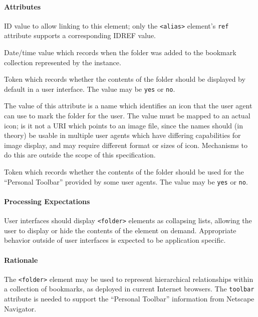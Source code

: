 \documentclass{howto}
\newcommand{\element}[1]{\texttt{<#1>}}
\newcommand{\attribute}[1]{\texttt{#1}}
\newcommand{\nmtoken}[1]{\texttt{#1}}
\begin{document}
      \paragraph*{Attributes}
        \begin{definitions}
          \term{\attribute{id}}
          ID value to allow linking to this element; only the
          \element{alias} element's \attribute{ref} attribute supports
          a corresponding IDREF value.

          \term{\attribute{added}}
          Date/time value which records when the folder was added to
          the bookmark collection represented by the instance.

          \term{\attribute{folded}}
          Token which records whether the contents of the folder
          should be displayed by default in a user interface.  The
          value may be \nmtoken{yes} or \nmtoken{no}.

          \term{\attribute{icon}}
          The value of this attribute is a name which identifies an
          icon that the user agent can use to mark the folder for the
          user.  The value must be mapped to an actual icon; is it not
          a URI which points to an image file, since the names should
          (in theory) be usable in multiple user agents which have
          differing capabilities for image display, and may require
          different format or sizes of icon.  Mechanisms to do this
          are outside the scope of this specification.

          \term{\attribute{toolbar}}
          Token which records whether the contents of the folder
          should be used for the ``Personal Toolbar'' provided by some
          user agents.  The value may be \nmtoken{yes} or \nmtoken{no}.
	\end{definitions}

      \paragraph*{Processing Expectations}
        User interfaces should display \element{folder} elements as
        collapsing lists, allowing the user to display or hide the
        contents of the element on demand.  Appropriate behavior
        outside of user interfaces is expected to be application
        specific.

      \paragraph*{Rationale}
        The \element{folder} element may be used to represent
        hierarchical relationships within a collection of bookmarks,
        as deployed in current Internet browsers.
        The \attribute{toolbar} attribute is needed to support the
        ``Personal Toolbar'' information from Netscape Navigator.
\end{document}

